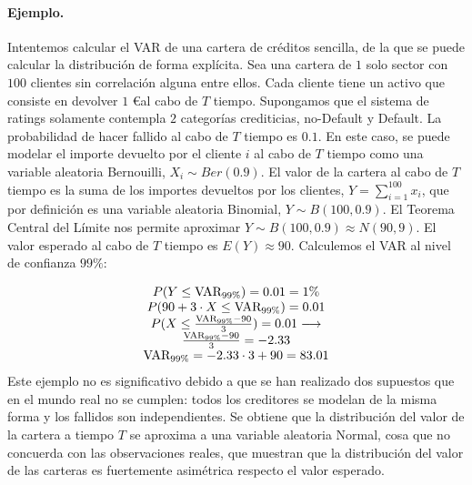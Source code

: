 \paragraph{Ejemplo.} Intentemos calcular el VAR de una cartera de cr\'editos
sencilla, de la que se puede calcular la distribuci\'on de forma expl\'icita. 
Sea una cartera de $1$ solo sector con $100$ clientes sin correlaci\'on alguna
entre ellos. Cada cliente tiene un activo que consiste en devolver $1$ \euro al
cabo de $T$ tiempo. Supongamos que el sistema de ratings solamente contempla 
$2$ categor\'ias crediticias, no-Default y Default. La probabilidad de hacer 
fallido al cabo de $T$ tiempo es $0.1$.
\newline
\newline
En este caso, se puede modelar el importe devuelto por el cliente $i$ al cabo 
de $T$ tiempo como una variable aleatoria Bernouilli, $X_i \sim Ber(0.9)$. El 
valor de la cartera al cabo de $T$ tiempo es la suma de los importes devueltos 
por los clientes, $Y = \sum_{i=1}^{100} x_i$, que por definici\'on es una 
variable aleatoria Binomial, $Y \sim B(100,0.9)$. El Teorema Central del 
L\'imite nos permite aproximar $Y \sim B(100,0.9) \approx N(90, 9)$.
\newline
\newline
El valor esperado al cabo de $T$ tiempo es $E(Y) \approx 90$. Calculemos el VAR 
al nivel de confianza $99\%$:

\begin{displaymath}
\begin{array}{c}
P(Y \leq \textrm{VAR}_{99\%}) = 0.01 = 1\% \cr
P(90 + 3 \cdot X \leq \textrm{VAR}_{99\%}) = 0.01 \cr
P(X \leq \frac{\textrm{VAR}_{99\%} - 90}{3}) = 0.01 \longrightarrow \cr
\frac{\textrm{VAR}_{99\%} - 90}{3} = -2.33 \cr
\textrm{VAR}_{99\%} = -2.33 \cdot 3 + 90 = 83.01
\end{array}
\end{displaymath}
\newline
\newline
Este ejemplo no es significativo debido a que se han realizado dos supuestos 
que en el mundo real no se cumplen: todos los creditores se modelan de la misma 
forma y los fallidos son independientes. Se obtiene que la distribuci\'on del 
valor de la cartera a tiempo $T$ se aproxima a una variable aleatoria Normal,
cosa que no concuerda con las observaciones reales, que muestran que la
distribuci\'on del valor de las carteras es fuertemente asim\'etrica respecto
el valor esperado.

